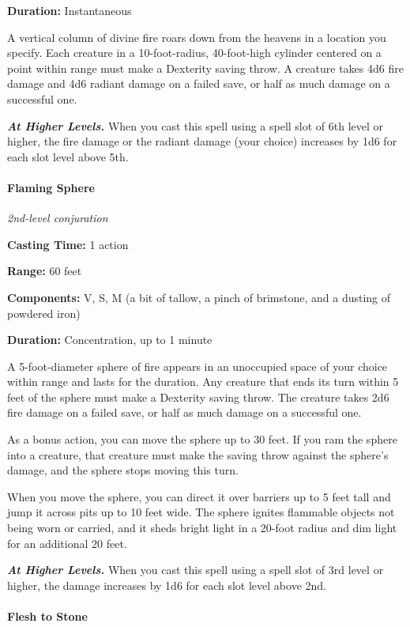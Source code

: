 \documentclass[
]{article}
\begin{document}
\textbf{Duration:} Instantaneous

A vertical column of divine fire roars down from the heavens in a
location you specify. Each creature in a 10-foot-radius, 40-foot-high
cylinder centered on a point within range must make a Dexterity saving
throw. A creature takes 4d6 fire damage and 4d6 radiant damage on a
failed save, or half as much damage on a successful one.

\emph{\textbf{At Higher Levels.}} When you cast this spell using a spell
slot of 6th level or higher, the fire damage or the radiant damage (your
choice) increases by 1d6 for each slot level above 5th.

\hypertarget{flaming-sphere}{%
\paragraph{Flaming Sphere}\label{flaming-sphere}}

\emph{2nd-level conjuration}

\textbf{Casting Time:} 1 action

\textbf{Range:} 60 feet

\textbf{Components:} V, S, M (a bit of tallow, a pinch of brimstone, and
a dusting of powdered iron)

\textbf{Duration:} Concentration, up to 1 minute

A 5-foot-diameter sphere of fire appears in an unoccupied space of your
choice within range and lasts for the duration. Any creature that ends
its turn within 5 feet of the sphere must make a Dexterity saving throw.
The creature takes 2d6 fire damage on a failed save, or half as much
damage on a successful one.

As a bonus action, you can move the sphere up to 30 feet. If you ram the
sphere into a creature, that creature must make the saving throw against
the sphere's damage, and the sphere stops moving this turn.

When you move the sphere, you can direct it over barriers up to 5 feet
tall and jump it across pits up to 10 feet wide. The sphere ignites
flammable objects not being worn or carried, and it sheds bright light
in a 20-foot radius and dim light for an additional 20 feet.

\emph{\textbf{At Higher Levels.}} When you cast this spell using a spell
slot of 3rd level or higher, the damage increases by 1d6 for each slot
level above 2nd.

\hypertarget{flesh-to-stone}{%
\paragraph{Flesh to Stone}\label{flesh-to-stone}}
\end{document}
